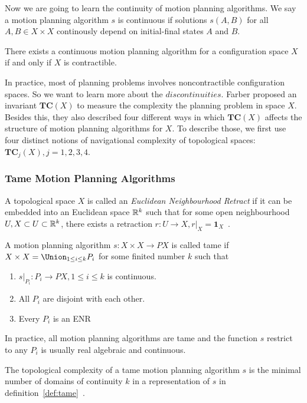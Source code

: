 Now we are going to learn the continuity of motion planning algorithms.
We say a motion planning algorithm \(s\) is continuous if solutions \(s(A,B)\) for all \(A,B\in X\times X\) continously depend on initial-final states \(A\) and \(B\).

\begin{lemma}
There exists a continuous motion planning algorithm for a configuration space \(X\) if and only if \(X\) is contractible.
\end{lemma}
In practice, most of planning problems involves noncontractible configuration spaces.
So we want to learn more about the \(discontinuities\).
Farber proposed an invariant \(\mathbf{TC}(X)\) to measure the complexity the planning problem in space \(X\).
Besides this, they also described four different ways in which \(\mathbf{TC}(X)\) affects the structure of motion planning algorithms for \(X\).
To describe those, we first use four distinct notions of navigational complexity of topological spaces: \(\mathbf{TC}_j(X), j=1,2,3,4\).

\subsubsection{Tame Motion Planning Algorithms}
A topological space \(X\) is called an \textit{Euclidean Neighbourhood Retract} if it can be embedded into an Euclidean space \(\mathbb{R}^k\) such that for some open neighbourhood \(U, X\subset U\subset \mathbb{R}^k\), there exists a retraction \(r:U\to X,r|_X=\mathbf{1}_X\)~\cite{farber2004instabilities}.
\begin{definition}\label{def:tame}
  A motion planning algorithm \(s:X\times X\to PX\) is called tame if \(X\times X=\Union_{1\le i\le k} P_i\) for some finited number \(k\) such that
  \begin{enumerate}[label=\arabic*)]
  \item \(s|_{P_i}:P_i\to PX, 1\le i\le k\) is continuous.
  \item All \(P_i\) are disjoint with each other.
  \item Every \(P_i\) is an ENR
  \end{enumerate}
\end{definition}

In practice, all motion planning algorithms are tame and the function \(s\) restrict to any \(P_i\) is usually real algebraic and continuous.

\begin{definition}
  The topological complexity of a tame motion planning algorithm \(s\) is the minimal number of domains of continuity \(k\) in a representation of \(s\) in definition~\ref{def:tame}~\cite{DBLP:journals/dcg/Farber03}.
\end{definition}

